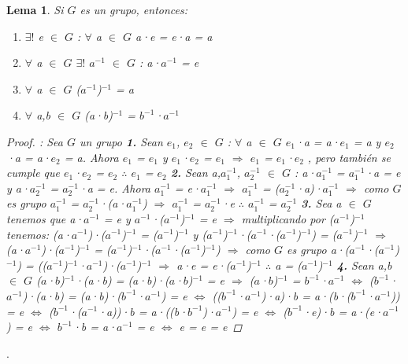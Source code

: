 \documentclass[10pt,a4paper,oneside]{article}
\newtheorem{lem}{Lema}[section]
\begin{document}
			\begin{lem}
				Si $G$ es un grupo, entonces:
				\begin{enumerate}
					\item $\exists!$ e $\in$ $G$ : $\forall$ a $\in$ $G$ a·e = e·a = a
					\item $\forall$ a $\in$ $G$ $\exists!$ $a^{-1}$ $\in$ $G$ : a·$a^{-1}$ = e
					\item $\forall$ a $\in$ $G$ ($a^{-1}$)$^{-1}$ = a
					\item $\forall$ a,b $\in$ $G$ (a·b)$^{-1}$ = $b^{-1}$·$a^{-1}$
				\end{enumerate}
				\begin{proof}:
					\newline
					Sea $G$ un grupo
					\newline
					\newline
					\textbf{1.} Sean $e_{1}$, $e_{2}$ $\in$ $G$ : $\forall$ a $\in$ $G$ $e_{1}$·a = a·$e_{1}$ = a y $e_{2}$·a = a·$e_{2}$ = a. Ahora $e_{1}$ = $e_{1}$ y $e_{1}$·$e_{2}$ = $e_{1}$ $\Rightarrow$ $e_{1}$ = $e_{1}$·$e_{2}$ ,  pero también se cumple que $e_{1}$·$e_{2}$ = $e_{2}$
					\newline
					$\therefore$ $e_{1}$ = $e_{2}$
					\newline
					\newline
					\textbf{2.} Sean a,$a_{1}^{-1}$, $a_{2}^{-1}$ $\in$ $G$ : a·$a_{1}^{-1}$ = $a_{1}^{-1}$·a = e y a·$a_{2}^{-1}$ = $a_{2}^{-1}$·a = e. Ahora $a_{1}^{-1}$ = e·$a_{1}^{-1}$ $\Rightarrow$ $a_{1}^{-1}$ = ($a_{2}^{-1}$·a)·$a_{1}^{-1}$ $\Rightarrow$ como $G$ es grupo $a_{1}^{-1}$ = $a_{2}^{-1}$·(a·$a_{1}^{-1}$) $\Rightarrow$ $a_{1}^{-1}$ = $a_{2}^{-1}$·e 
					\newline
					$\therefore$ $a_{1}^{-1}$ = $a_{2}^{-1}$
					\newline
					\newline
					\textbf{3.} Sea a $\in$ $G$ tenemos que a·$a^{-1}$ = e y $a^{-1}$·($a^{-1}$)$^{-1}$ = e $\Rightarrow$ multiplicando por ($a^{-1}$)$^{-1}$ tenemos: (a·$a^{-1}$)·($a^{-1}$)$^{-1}$ = ($a^{-1}$)$^{-1}$ y ($a^{-1}$)$^{-1}$·($a^{-1}$·($a^{-1}$)$^{-1}$) = ($a^{-1}$)$^{-1}$ $\Rightarrow$ (a·$a^{-1}$)·($a^{-1}$)$^{-1}$ = ($a^{-1}$)$^{-1}$·($a^{-1}$·($a^{-1}$)$^{-1}$) $\Rightarrow$ como $G$ es grupo a·($a^{-1}$·($a^{-1}$)$^{-1}$) = (($a^{-1}$)$^{-1}$·$a^{-1}$)·($a^{-1}$)$^{-1}$ $\Rightarrow$ a·e = e·($a^{-1}$)$^{-1}$ $\therefore$ a = ($a^{-1}$)$^{-1}$
					\newline
					\newline
					\textbf{4.} Sean a,b $\in$ $G$
					\newline
					($a$·$b$)$^{-1}$·(a·b) = (a·b)·($a$·$b$)$^{-1}$ = e $\Rightarrow$ ($a$·$b$)$^{-1}$ = $b^{-1}$·$a^{-1}$ $\iff$ ($b^{-1}$·$a^{-1}$)·(a·b) = (a·b)·($b^{-1}$·$a^{-1}$) = e $\iff$ (($b^{-1}$·$a^{-1}$)·a)·b = a·(b·($b^{-1}$·$a^{-1}$)) = e $\iff$ ($b^{-1}$·($a^{-1}$·a))·b = a·((b·$b^{-1}$)·$a^{-1}$) = e $\iff$ ($b^{-1}$·e)·b = a·(e·$a^{-1}$) = e $\iff$ $b^{-1}$·b = a·$a^{-1}$ = e $\iff$ e = e = e
				\end{proof}
			\end{lem}.
\end{document}
